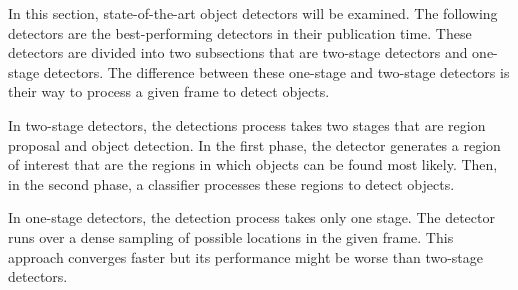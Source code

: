 \documentclass{article}
\begin{document}
\setlength{\parindent}{6ex}

\indent

In this section, state-of-the-art object detectors will be examined. 
The following detectors are the best-performing detectors in their 
publication time. These detectors are divided into two subsections that 
are two-stage detectors and one-stage detectors. The difference between 
these one-stage and two-stage detectors is their way to process a given 
frame to detect objects. \par 

In two-stage detectors, the detections process takes two stages that are 
region proposal and object detection. In the first phase, the detector generates 
a region of interest that are the regions in which objects can be found 
most likely. Then, in the second phase, a classifier processes these regions 
to detect objects. \par

In one-stage detectors, the detection process takes only one stage. 
The detector runs over a dense sampling of possible locations in the given frame. 
This approach converges faster but its performance might be worse than 
two-stage detectors.
\end{document}
